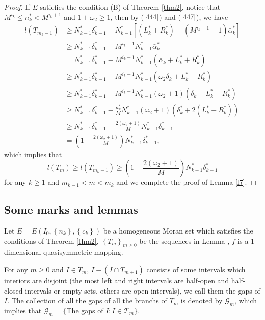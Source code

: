 \documentclass[reqno]{amsart}
\theoremstyle{plain}
\theoremstyle{definition}
\theoremstyle{remark}
\numberwithin{equation}{section} \DeclareMathOperator\intr{int}
\begin{document}
\begin{proof}
If $E$ satiefies the condition {\rm(B)} of Theorem {\rm\ref{thm2}}, notice that
$M^{i_k}\le n^*_k <M^{i_k+1}$ and $1+\omega_2\ge 1$, then by ($\ref{444}$) and ($\ref{447}$), we have
\begin{equation}
\begin{aligned}
l(T_{m_k-1})&\ge N^*_{k-1}\delta^*_{k-1}-N^*_{k-1}[(L^*_k+R^*_k)+(M^{i_k-1}-1)\bar{\alpha}^*_k]\\
&\ge N^*_{k-1}\delta^*_{k-1}-M^{i_k-1}N^*_{k-1}\bar{\alpha}^*_k\\
&= N^*_{k-1}\delta^*_{k-1}-M^{i_k-1}N^*_{k-1}(\bar{\alpha}_k+L^*_k+R^*_k)\\
&\ge N^*_{k-1}\delta^*_{k-1}-M^{i_k-1}N^*_{k-1}(\omega_2\delta_k+L^*_k+R^*_k)\\
&\ge N^*_{k-1}\delta^*_{k-1}-M^{i_k-1}N^*_{k-1}(\omega_2+1)(\delta_k+L^*_k+R^*_k)\\
&\ge N^*_{k-1}\delta^*_{k-1}-\frac{n^*_k}{M}N^*_{k-1}(\omega_2+1)(\delta^*_k+2(L^*_k+R^*_k))\\
&\ge N^*_{k-1}\delta^*_{k-1}-\frac{2(\omega_2+1)}{M}N^*_{k-1}\delta^*_{k-1}\\
&= (1-\frac{2(\omega_2+1)}{M})N^*_{k-1}\delta^*_{k-1},\nonumber
\end{aligned}
\end{equation}
which implies that
\begin{equation*}
l(T_m)\ge  l(T_{m_{k}-1}) \ge(1-\frac{2(\omega_2+1)}{M})N^*_{k-1}\delta^*_{k-1}
\end{equation*}
for any $k\ge 1$ and $m_{k-1}<m<m_{k}$ and we complete the proof of Lemma \ref{l7}.
\end{proof}

\bigskip


\subsection{Some marks and lemmas}

Let $E=E(I_{0},\left\{n_{k}\right\},\left\{c_{k}\right\})$ be a homogeneous Moran set which satisfies the conditions of Theorem \ref{thm2}, $\left\{T_{m}\right\}_{m\ge0}$ be the sequences in Lemma \text{\rm\ref{l6}}, $f$ is a 1-dimensional quasisymmetric mapping.



For any $m\ge0$ and $I\in T_m$, $I-(I\cap T_{m+1})$ consists of some intervals which interiors are disjoint (the most left and right  intervals  are half-open and half-closed intervals or empty sets, others are open intervals), we call them the gaps of $I$. The collection of all the gaps of all the branchs of $T_m$ is denoted by  $\mathcal{G}_m$, which implies that $\mathcal{G}_m=\{$The gaps of $I: I\in \mathcal{T}_m\}$.
\end{document}
